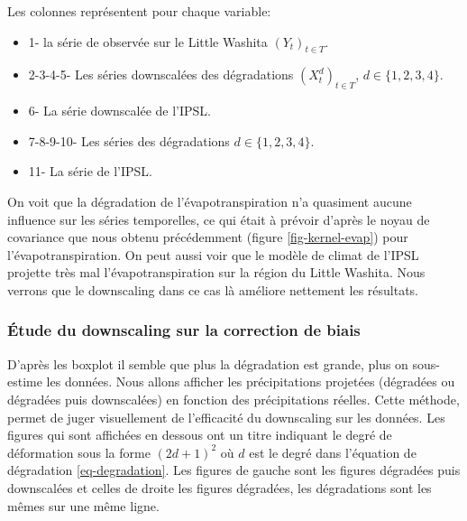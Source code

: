 \documentclass[a4paper,11pt]{article}
\numberwithin{equation}{section}
\begin{document}
Les colonnes représentent pour chaque variable:
\begin{itemize}
	\item 1- la série de observée sur le Little Washita $(Y_t)_{t\in T}$. 
	\item 2-3-4-5- Les séries downscalées des dégradations $(X^d_t)_{t \in T}$, $d \in \{1,2,3,4\}$.
	\item 6- La série downscalée de l'IPSL. 
	\item 7-8-9-10- Les séries des dégradations $d \in \{1,2,3,4\}$.
	\item 11- La série de l'IPSL. 
\end{itemize}
On voit que la dégradation de l'évapotranspiration n'a quasiment aucune influence sur les séries temporelles, ce qui était à prévoir d'après le noyau de covariance que nous obtenu précédemment (figure \ref{fig-kernel-evap}) pour l'évapotranspiration. On peut aussi voir que le modèle de climat de l'IPSL projette très mal l'évapotranspiration sur la région du Little Washita. Nous verrons que le downscaling dans ce cas là améliore nettement les résultats.

\subsubsection{Étude du downscaling sur la correction de biais}

D'après les boxplot il semble que plus la dégradation est grande, plus on sous-estime les données. Nous allons afficher les précipitations projetées (dégradées ou dégradées puis downscalées) en fonction des précipitations réelles. Cette méthode, permet de juger visuellement de l'efficacité du downscaling sur les données. Les figures qui sont affichées en dessous ont un titre indiquant le degré de déformation sous la forme $(2d+1)^2$ où $d$ est le degré dans l'équation de dégradation \eqref{eq-degradation}. Les figures de gauche sont les figures dégradées puis downscalées et celles de droite les figures dégradées, les dégradations sont les mêmes sur une même ligne.	

\vspace{0.7cm}
\end{document}
